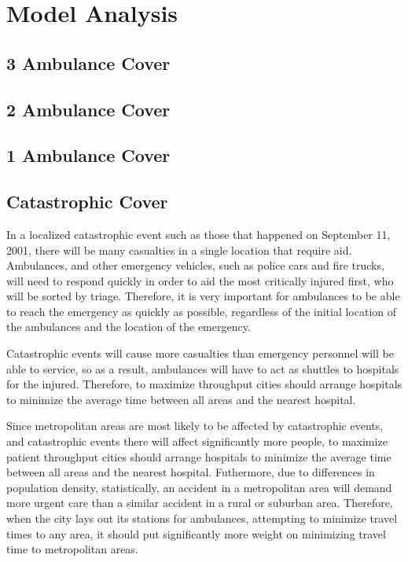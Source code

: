 \documentclass[notitlepage, 12pt]{article}
\begin{document}
\section{Model Analysis}

\subsection{3 Ambulance Cover}

\subsection{2 Ambulance Cover}

\subsection{1 Ambulance Cover}

\subsection{Catastrophic Cover}
In a localized catastrophic event such as those that happened on September 11, 2001, there will be
many casualties in a single location that require aid. Ambulances, and other emergency vehicles,
such as police cars and fire trucks, will need to respond quickly in order to aid the most critically
injured first, who will be sorted by triage. Therefore, it is very important for ambulances to be able to
reach the emergency as quickly as possible, regardless of the initial location of the ambulances and the
location of the emergency.

Catastrophic events will cause more casualties than emergency personnel will be able to service, so as a result,
ambulances will have to act as shuttles to hospitals for the injured. Therefore, to maximize throughput
cities should arrange hospitals to minimize the average time between all areas and the nearest
hospital.

Since metropolitan areas are most likely to be affected by catastrophic events, and catastrophic events there
will affect significantly more people, to maximize patient throughput cities should arrange hospitals to minimize
the average time between all areas and the nearest hospital. Futhermore, due to differences in population density,
statistically, an accident in a metropolitan area will demand more urgent care than a similar accident
in a rural or suburban area. Therefore, when the city lays out its stations for ambulances, attempting to minimize
travel times to any area, it should put significantly more weight on minimizing travel time to metropolitan areas.
\end{document}
